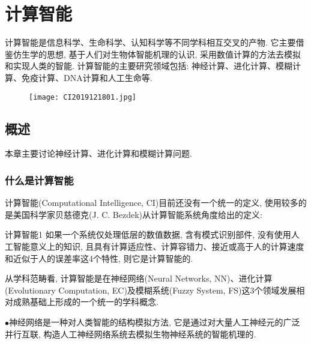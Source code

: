 \chapter{计算智能}
\begin{tcolorbox}[colback=white!50,colframe=orange!50,title=计算智能]
\begin{center}
计算智能是信息科学、生命科学、认知科学等不同学科相互交叉的产物. 它主要借鉴仿生学的思想, 基于人们对生物体智能机理的认识, 采用数值计算的方法去模拟和实现人类的智能.
计算智能的主要研究领域包括: 神经计算、进化计算、模糊计算、免疫计算、DNA计算和人工生命等.
\hfill
\end{center}
\end{tcolorbox}
\begin{figure}[H]
\centering
\texttt{[image: CI2019121801.jpg]}
\label{CI2019121801}
\end{figure}
\section{概述}
本章主要讨论神经计算、进化计算和模糊计算问题.
\subsection{什么是计算智能}
计算智能(Computational Intelligence, CI)目前还没有一个统一的定义, 使用较多的是美国科学家贝慈德克(J. C. Bezdek)从计算智能系统角度给出的定义:
\begin{mydef}{计算智能}{1}
如果一个系统仅处理低层的数值数据, 含有模式识别部件, 没有使用人工智能意义上的知识, 且具有计算适应性、计算容错力、接近或高于人的计算速度和近似于人的误差率这4个特性, 则它是计算智能的.
\end{mydef}
\begin{remark}
  从学科范畴看, 计算智能是在神经网络(Neural Networks, NN)、进化计算(Evolutionary Computation, EC)及模糊系统(Fuzzy System, FS)这3个领域发展相对成熟基础上形成的一个统一的学科概念.
\end{remark}

$\bullet$神经网络是一种对人类智能的结构模拟方法, 它是通过对大量人工神经元的广泛并行互联, 构造人工神经网络系统去模拟生物神经系统的智能机理的.

